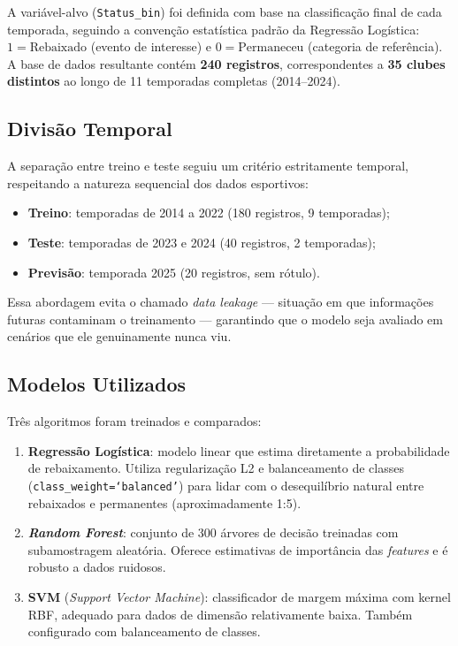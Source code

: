 A variável-alvo (\texttt{Status\_bin}) foi definida com base na classificação final
de cada temporada, seguindo a convenção estatística padrão da Regressão Logística:
$1 = \text{Rebaixado}$ (evento de interesse) e $0 = \text{Permaneceu}$ (categoria de referência).
A base de dados resultante contém \textbf{240 registros}, correspondentes a \textbf{35 clubes distintos}
ao longo de 11 temporadas completas (2014--2024).

\subsection{Divisão Temporal}

A separação entre treino e teste seguiu um critério estritamente temporal,
respeitando a natureza sequencial dos dados esportivos:

\begin{itemize}
    \item \textbf{Treino}: temporadas de 2014 a 2022 (180 registros, 9 temporadas);
    \item \textbf{Teste}: temporadas de 2023 e 2024 (40 registros, 2 temporadas);
    \item \textbf{Previsão}: temporada 2025 (20 registros, sem rótulo).
\end{itemize}

Essa abordagem evita o chamado \textit{data leakage} — situação em que informações
futuras contaminam o treinamento — garantindo que o modelo seja avaliado
em cenários que ele genuinamente nunca viu.

\subsection{Modelos Utilizados}

Três algoritmos foram treinados e comparados:

\begin{enumerate}
    \item \textbf{Regressão Logística}: modelo linear que estima diretamente a probabilidade
          de rebaixamento. Utiliza regularização L2 e balanceamento de classes
          (\texttt{class\_weight=`balanced'}) para lidar com o desequilíbrio natural
          entre rebaixados e permanentes (aproximadamente 1:5).

    \item \textbf{\textit{Random Forest}}: conjunto de 300 árvores de decisão treinadas
          com subamostragem aleatória. Oferece estimativas de importância das \textit{features}
          e é robusto a dados ruidosos.

    \item \textbf{SVM} (\textit{Support Vector Machine}): classificador de margem máxima
          com kernel RBF, adequado para dados de dimensão relativamente baixa.
          Também configurado com balanceamento de classes.
\end{enumerate}

